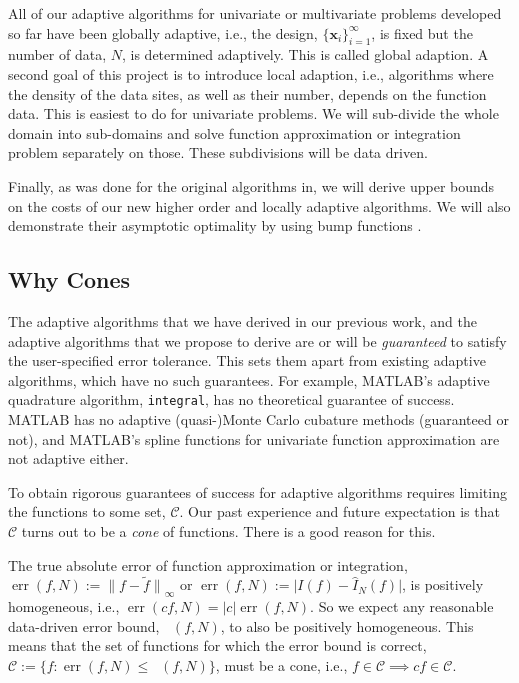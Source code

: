 \documentclass[11pt]{NSFamsart}
\newcommand{\hI}{\hat{I}}
\newcommand{\tf}{\tilde{f}}
\DeclareMathOperator{\err}{err}
\DeclareMathOperator{\oerr}{\overline{\err}}
\newcommand{\bx}{{\boldsymbol{x}}}
\newcommand{\calc}{{\mathcal{C}}}
\def\abs#1{\ensuremath{\left \lvert #1 \right \rvert}}
\newcommand{\bigabs}[1]{\ensuremath{\bigl \lvert #1 \bigr \rvert}}
\newcommand{\bignorm}[2][{}]{\ensuremath{\bigl \lVert #2 \bigr \rVert}_{#1}}
\newcommand{\desinf}{\{\bx_i\}_{i=1}^{\infty}}
\begin{document}
All of our adaptive algorithms for univariate or multivariate problems developed so far have been globally adaptive, i.e., the design, $\desinf$, is fixed but the number of data, $N$, is determined adaptively.  This is called global adaption.  A second goal of this project  is to introduce local adaption, i.e., algorithms where the density of the data sites, as well as their number, depends on the function data.  This is easiest to do for univariate problems.  We will sub-divide the whole domain into sub-domains and solve function approximation or integration problem separately on those.  These subdivisions will be data driven.

Finally, as was done for the original algorithms in\citep{HicEtal14b}, we will derive upper bounds on the costs of our new higher order and locally adaptive algorithms.  We will also demonstrate their asymptotic optimality by using bump functions \cite{TraWasWoz88,Nov88}.

\subsection*{Why Cones} The adaptive algorithms that we have derived in our previous work, and the adaptive algorithms that we propose to derive are or will be \emph{guaranteed} to satisfy the user-specified error tolerance.  This sets them apart from existing adaptive algorithms, which have no such guarantees.  For example, MATLAB's adaptive quadrature algorithm, \texttt{integral}, has no theoretical guarantee of success.  MATLAB has no adaptive (quasi-)Monte Carlo cubature methods (guaranteed or not), and MATLAB's spline functions for univariate function approximation are not adaptive either.

To obtain rigorous guarantees of success for adaptive algorithms requires limiting the functions to some set, $\calc$.  Our past experience and future expectation is that $\calc$ turns out to be a \emph{cone} of functions. There is a good reason for this.

The true absolute error of function approximation or integration, $\err(f,N):=\bignorm[\infty]{f-\tf}$ or $\err(f,N):= \bigabs{I(f) - \hI_N(f)}$, is positively homogeneous, i.e., $\err(cf,N)=\abs{c} \err(f,N)$. So we expect any reasonable data-driven error bound, $\oerr(f,N)$, to also be positively homogeneous.  This means that the set of functions for which the error bound is correct, $\calc:=\{f : \err(f,N) \le \oerr(f,N)\}$, must be a cone, i.e., $f\in \calc \implies cf \in \calc$.
\end{document}
